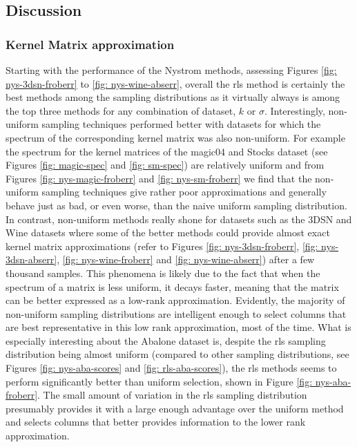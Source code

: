 \subsection{Discussion}\label{Section5.3}

\subsubsection{Kernel Matrix approximation}\label{Section5.3.1}

Starting with the performance of the Nystrom methods, assessing Figures \ref{fig: nys-3dsn-froberr} to \ref{fig: nys-wine-abserr}, overall the rls method is certainly the best methods among the sampling distributions as it virtually always is among the top three methods for any combination of dataset, $k$ or $\sigma$. Interestingly, non-uniform sampling techniques performed better with datasets for which the spectrum of the corresponding kernel matrix was also non-uniform. For example the spectrum for the kernel matrices of the magic04 and Stocks dataset (see Figures \ref{fig: magic-spec} and \ref{fig: sm-spec}) are relatively uniform and from Figures \ref{fig: nys-magic-froberr} and \ref{fig: nys-sm-froberr} we find that the non-uniform sampling techniques give rather poor approximations and generally behave just as bad, or even worse, than the naive uniform sampling distribution. In contrast, non-uniform methods really shone for datasets such as the 3DSN and Wine datasets where some of the better methods could provide almost exact kernel matrix approximations (refer to Figures \ref{fig: nys-3dsn-froberr}, \ref{fig: nys-3dsn-abserr}, \ref{fig: nys-wine-froberr} and \ref{fig: nys-wine-abserr}) after a few thousand samples. This phenomena is likely due to the fact that when the spectrum of a matrix is less uniform, it decays faster, meaning that the matrix can be better expressed as a low-rank approximation. Evidently, the majority of non-uniform sampling distributions are intelligent enough to select columns that are best representative in this low rank approximation, most of the time. What is especially interesting about the Abalone dataset is, despite the rls sampling distribution being almost uniform (compared to other sampling distributions, see Figures \ref{fig: nys-aba-scores} and \ref{fig: rls-aba-scores}), the rls methods seems to perform significantly better than uniform selection, shown in Figure \ref{fig: nys-aba-froberr}. The small amount of variation in the rls sampling distribution presumably provides it with a large enough advantage over the uniform method and selects columns that better provides information to the lower rank approximation.

